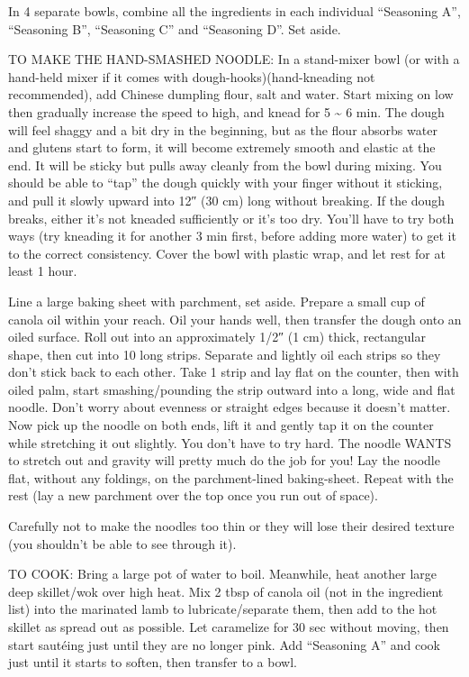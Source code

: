 \documentclass[
]{article}
\begin{document}
In 4 separate bowls, combine all the ingredients in each individual ``Seasoning A'', ``Seasoning B'', ``Seasoning C'' and ``Seasoning D''. Set aside.

TO MAKE THE HAND-SMASHED NOODLE: In a stand-mixer bowl (or with a hand-held mixer if it comes with dough-hooks)(hand-kneading not recommended), add Chinese dumpling flour, salt and water. Start mixing on low then gradually increase the speed to high, and knead for 5 \textasciitilde{} 6 min. The dough will feel shaggy and a bit dry in the beginning, but as the flour absorbs water and glutens start to form, it will become extremely smooth and elastic at the end. It will be sticky but pulls away cleanly from the bowl during mixing. You should be able to ``tap'' the dough quickly with your finger without it sticking, and pull it slowly upward into 12″ (30 cm) long without breaking. If the dough breaks, either it's not kneaded sufficiently or it's too dry. You'll have to try both ways (try kneading it for another 3 min first, before adding more water) to get it to the correct consistency. Cover the bowl with plastic wrap, and let rest for at least 1 hour.

Line a large baking sheet with parchment, set aside. Prepare a small cup of canola oil within your reach. Oil your hands well, then transfer the dough onto an oiled surface. Roll out into an approximately 1/2″ (1 cm) thick, rectangular shape, then cut into 10 long strips. Separate and lightly oil each strips so they don't stick back to each other. Take 1 strip and lay flat on the counter, then with oiled palm, start smashing/pounding the strip outward into a long, wide and flat noodle. Don't worry about evenness or straight edges because it doesn't matter. Now pick up the noodle on both ends, lift it and gently tap it on the counter while stretching it out slightly. You don't have to try hard. The noodle WANTS to stretch out and gravity will pretty much do the job for you! Lay the noodle flat, without any foldings, on the parchment-lined baking-sheet. Repeat with the rest (lay a new parchment over the top once you run out of space).

Carefully not to make the noodles too thin or they will lose their desired texture (you shouldn't be able to see through it).

TO COOK: Bring a large pot of water to boil. Meanwhile, heat another large deep skillet/wok over high heat. Mix 2 tbsp of canola oil (not in the ingredient list) into the marinated lamb to lubricate/separate them, then add to the hot skillet as spread out as possible. Let caramelize for 30 sec without moving, then start sautéing just until they are no longer pink. Add ``Seasoning A'' and cook just until it starts to soften, then transfer to a bowl.
\end{document}
